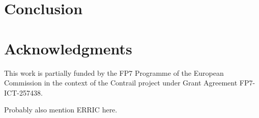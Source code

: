 \documentclass[10pt,twocolumn]{article}
\begin{document}


\section*{Conclusion}




\section*{Acknowledgments}

This work is partially funded by the FP7 Programme of the European
Commission in the context of the Contrail project under Grant
Agreement FP7-ICT-257438.

Probably also mention ERRIC here.




\end{document}

